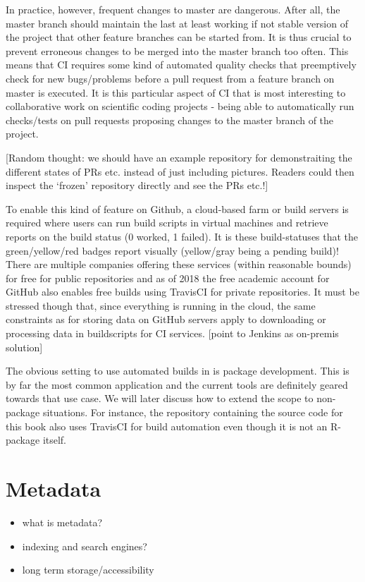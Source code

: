 \documentclass[]{book}
\providecommand{\tightlist}{%
  \setlength{\itemsep}{0pt}\setlength{\parskip}{0pt}}
\begin{document}
In practice, however, frequent changes to master are dangerous. After
all, the master branch should maintain the last at least working if not
stable version of the project that other feature branches can be started
from. It is thus crucial to prevent erroneous changes to be merged into
the master branch too often. This means that CI requires some kind of
automated quality checks that preemptively check for new bugs/problems
before a pull request from a feature branch on master is executed. It is
this particular aspect of CI that is most interesting to collaborative
work on scientific coding projects - being able to automatically run
checks/tests on pull requests proposing changes to the master branch of
the project.

{[}Random thought: we should have an example repository for
demonstraiting the different states of PRs etc. instead of just
including pictures. Readers could then inspect the `frozen' repository
directly and see the PRs etc.!{]}

To enable this kind of feature on Github, a cloud-based farm or build
servers is required where users can run build scripts in virtual
machines and retrieve reports on the build status (0 worked, 1 failed).
It is these build-statuses that the green/yellow/red badges report
visually (yellow/gray being a pending build)! There are multiple
companies offering these services (within reasonable bounds) for free
for public repositories and as of 2018 the free academic account for
GitHub also enables free builds using TravisCI for private repositories.
It must be stressed though that, since everything is running in the
cloud, the same constraints as for storing data on GitHub servers apply
to downloading or processing data in buildscripts for CI services.
{[}point to Jenkins as on-premis solution{]}

The obvious setting to use automated builds in is package development.
This is by far the most common application and the current tools are
definitely geared towards that use case. We will later discuss how to
extend the scope to non-package situations. For instance, the repository
containing the source code for this book also uses TravisCI for build
automation even though it is not an R-package itself.

\chapter{Metadata}\label{chptr-metadata}

\begin{itemize}
\tightlist
\item
  what is metadata?
\item
  indexing and search engines?
\item
  long term storage/accessibility
\end{itemize}
\end{document}
